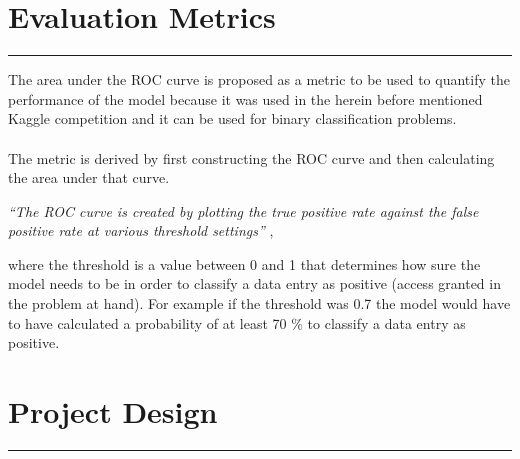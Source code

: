 \documentclass[11pt]{article}
\def\sectionheader#1{\section*{#1}\vskip -0.3cm\hrule\vskip 0.3cm}
\begin{document}
\sectionheader{Evaluation Metrics}

The area under the ROC curve is proposed as a metric to be used to quantify the performance of 
the model because it was used in the herein before mentioned Kaggle competition and it can 
be used for binary classification problems. 
\\ \\
The metric is derived by first constructing the ROC curve and then calculating the area under 
that curve. 

{\it``The ROC curve is created by plotting the true positive rate against the false 
positive rate at various threshold settings''} \cite{rocCurve},
 
where the threshold is a value between 0 and 1 that determines how sure the model needs 
to be in order to classify a data entry as positive (access granted in the problem at hand). 
For example if the threshold was 0.7 the model would have to have calculated a probability 
of at least 70 $\%$ to classify a data entry as positive.

\sectionheader{Project Design}
\end{document}

